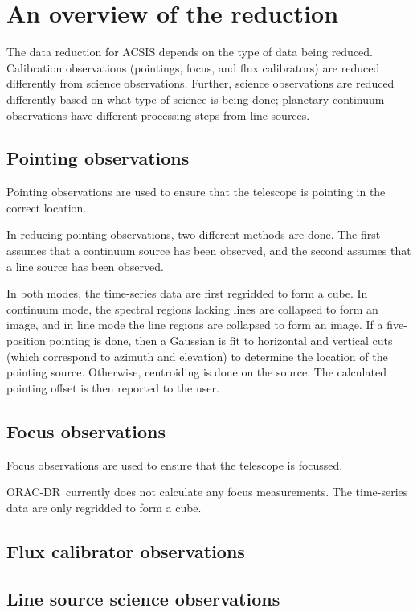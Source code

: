 \documentclass[twoside,11pt]{article}
\renewcommand{\_}{\texttt{\symbol{95}}}
\newcommand{\ORACDR}{{\footnotesize ORAC-DR}}
\begin{document}
\section{An overview of the reduction}

The data reduction for ACSIS depends on the type of data being
reduced. Calibration observations (pointings, focus, and flux calibrators) are
reduced differently from science observations. Further, science observations
are reduced differently based on what type of science is being done; planetary
continuum observations have different processing steps from line sources.

\subsection{Pointing observations}

Pointing observations are used to ensure that the telescope is pointing in the
correct location.

In reducing pointing observations, two different methods are done. The first
assumes that a continuum source has been observed, and the second assumes that
a line source has been observed.

In both modes, the time-series data are first regridded to form a cube. In
continuum mode, the spectral regions lacking lines are collapsed to form an
image, and in line mode the line regions are collapsed to form an image. If a
five-position pointing is done, then a Gaussian is fit to horizontal and
vertical cuts (which correspond to azimuth and elevation) to determine the
location of the pointing source. Otherwise, centroiding is done on the
source. The calculated pointing offset is then reported to the user.

\subsection{Focus observations}

Focus observations are used to ensure that the telescope is focussed.

\ORACDR\ currently does not calculate any focus measurements. The time-series
data are only regridded to form a cube.

\subsection{Flux calibrator observations}

\subsection{Line source science observations}
\end{document}
